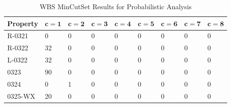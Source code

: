\begin{table}[h]
\begin{center}
    \begin{tabular}{ | l | l | l | l | l | l | l | l | l |}
    \hline
    \textbf{Property} & $\bm{c = 1}$ & $\bm{c = 2}$ & $\bm{c = 3}$ & $\bm{c = 4}$ 
		& $\bm{c = 5}$ & $\bm{c = 6}$ & $\bm{c = 7}$ & $\bm{c = 8}$  \\ \hline \hline
    R-0321 & 0 & 0 & 0 & 0 & 0 & 0 & 0 & 0 \\ \hline
    R-0322 & 32 & 0 & 0 &0 &0 &0 &0& 0  \\ \hline
    L-0322 & 32 & 0 & 0 & 0 & 0 & 0 & 0 & 0  \\ \hline
    0323 & 90 & 0 & 0 & 0 & 0 & 0 & 0 & 0  \\ \hline
    0324 & 0 & 1 & 0 & 0 & 0 & 0 & 0 & 0  \\ \hline
    0325-WX & 20 & 0 & 0 &0 &0 & 0 & 0 & 0  \\ \hline 
    \end{tabular}
    \vspace{0.1in}
    \caption{WBS MinCutSet Results for Probabilistic Analysis}
    \vspace{-0.3in}
    \label{tab:wbs_prob_results}
\end{center}
\end{table}
